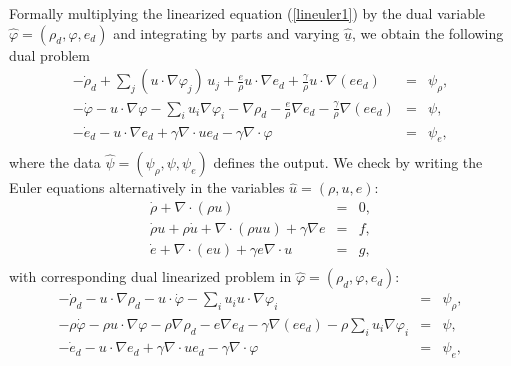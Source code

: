 Formally multiplying the linearized equation (\ref{lineuler1})
by the dual variable $\hat\varphi =(\rho_d,\varphi ,e_d)$
and integrating by parts and varying $\underline{\hat u}$, we
obtain the following dual problem
\begin{equation}\label{dualeuler}
\begin{array}{rcl}
-\dot \rho_d+\sum_{j}(u\cdot\nabla\varphi_{j})\,u_j+\frac{e}{\rho}u\cdot\nabla e_d+\frac{\gamma}{\rho}u\cdot\nabla (ee_d)
&=&  \psi_\rho , \\
-\dot\varphi - u\cdot\nabla\varphi -\sum_iu_i\nabla\varphi_{i}-\nabla\rho_d 
-\frac{e}{\rho}\nabla e_d-\frac{\gamma}{\rho}\nabla (e e_d)&=&  \psi , \\
-\dot e_d -u\cdot\nabla e_d+\gamma\nabla\cdot ue_d-
\gamma\nabla\cdot\varphi &=& \psi_e ,\\ 
\end{array} 
\end{equation}
where the data $\hat\psi =(\psi_\rho ,\psi ,\psi_e)$ defines the output.
We check by writing the Euler equations alternatively
in the variables $\hat u=(\rho ,u,e)$:
\begin{equation}\label{euler10uve}
\begin{array}{rcl}
\dot \rho +\nabla\cdot (\rho u )&=&  0, \\
\dot \rho u+\rho\dot u +\nabla\cdot (\rho uu) + \gamma\nabla e&=&  f, \\
\dot e +\nabla\cdot (eu)+\gamma  e\nabla\cdot u &=& g,\\ 
\end{array} 
\end{equation}
with corresponding dual linearized problem 
in $\hat\varphi =(\rho_d, \varphi ,e_d)$:
\[
\begin{array}{rcl}
-\dot \rho_d-u\cdot\nabla\rho_d -u\cdot\dot\varphi -\sum_iu_iu\cdot\nabla\varphi_i 
&=&  \psi_\rho , \\
-\rho\dot\varphi-\rho u\cdot\nabla\varphi -\rho\nabla\rho_d 
-e\nabla e_d-\gamma\nabla (e e_d)-\rho\sum_iu_i\nabla\varphi_{i}&=&  \psi , \\
-\dot e_d -u\cdot\nabla e_d+\gamma\nabla\cdot ue_d-
\gamma\nabla\cdot\varphi &=& \psi_e ,\\ 
\end{array} 
\]
